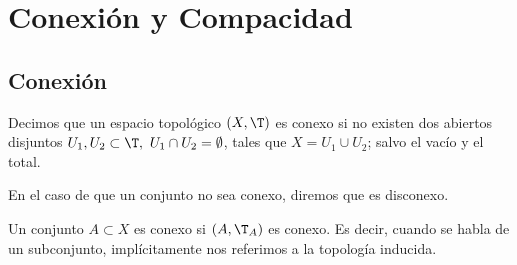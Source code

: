 \chapter{Conexión y Compacidad}

\section{Conexión}

\begin{definicion}[Conexión]
    Decimos que un espacio topológico $(X,\T)$ es conexo si no existen dos abiertos disjuntos $U_1,U_2\subset \T,~U_1\cap U_2=\emptyset$, tales que $X=U_1\cup U_2$; salvo el vacío y el total.

    En el caso de que un conjunto no sea conexo, diremos que es disconexo.

    Un conjunto $A\subset X$ es conexo si $(A,\T_A)$ es conexo. Es decir, cuando se habla de un subconjunto, implícitamente nos referimos a la topología inducida.
\end{definicion}

